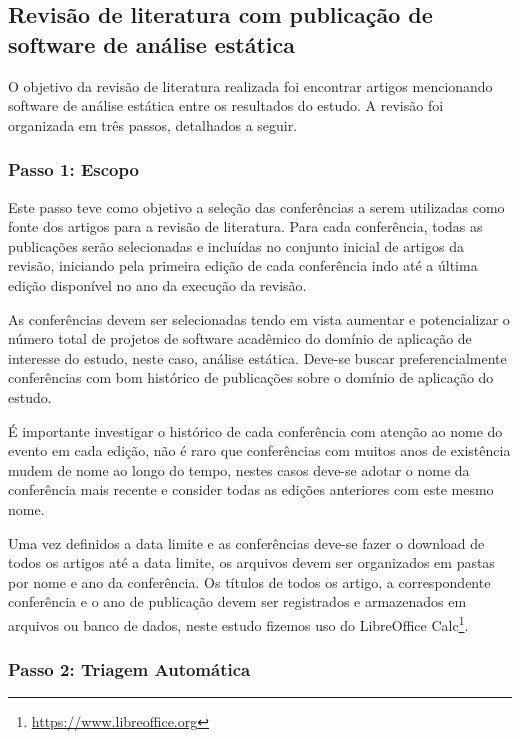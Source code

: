 \subsection{Revisão de literatura com publicação de software de análise estática}

O objetivo da revisão de literatura realizada foi encontrar artigos mencionando
software de análise estática entre os resultados do estudo. A revisão foi
organizada em três passos, detalhados a seguir.

\subsubsection{Passo 1: Escopo}

Este passo teve como objetivo a seleção das conferências a serem utilizadas como fonte dos
artigos para a revisão de literatura. 
Para cada conferência, todas as publicações serão selecionadas e
incluídas no conjunto inicial de artigos da revisão, iniciando pela primeira
edição de cada conferência indo até a última edição disponível no ano da execução da revisão.

As conferências devem ser selecionadas tendo em vista aumentar e potencializar
o número total de projetos de software acadêmico do domínio de aplicação de
interesse do estudo, neste caso, análise estática. Deve-se buscar
preferencialmente conferências com bom histórico de publicações sobre o domínio
de aplicação do estudo.

É importante investigar o histórico de cada conferência com atenção ao nome do
evento em cada edição, não é raro que conferências com muitos anos de
existência mudem de nome ao longo do tempo, nestes casos deve-se adotar o nome
da conferência mais recente e consider todas as edições anteriores com este
mesmo nome.

Uma vez definidos a data limite e as conferências deve-se fazer o download de
todos os artigos até a data limite, os arquivos devem ser organizados em pastas
por nome e ano da conferência. Os títulos de todos os artigo, a correspondente
conferência e o ano de publicação devem ser registrados e armazenados em
arquivos ou banco de dados, neste estudo fizemos uso do
LibreOffice Calc\footnote{\url{https://www.libreoffice.org}}.

\subsubsection{Passo 2: Triagem Automática} \label{estudo1:planejamento:filtro}

